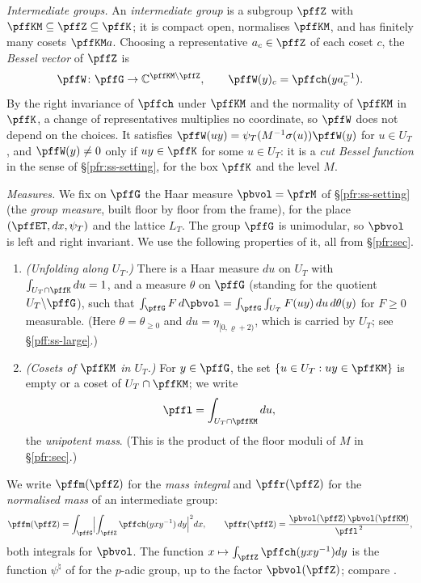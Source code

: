 \documentclass[10pt]{amsart}
\theoremstyle{definition}
\theoremstyle{remark}
\newcommand{\C}{\mathbb C}
\begin{document}
\emph{Intermediate groups.} An \emph{intermediate group} is a subgroup $\pffZ$ with $\pffKM\subseteq
\pffZ\subseteq\pffK$; it is compact open, normalises $\pffKM$, and has finitely many cosets
$\pffKM a$. Choosing a representative $a_c\in\pffZ$ of each coset $c$, the \emph{Bessel vector} of
$\pffZ$ is
\[
\pffW\colon\pffG\to\C^{\pffKM\backslash\pffZ},\qquad\pffW(y)_c=\pffch(ya_c^{-1}).
\]
By the right invariance of $\pffch$ under $\pffKM$ and the normality of $\pffKM$ in $\pffK$, a
change of representatives multiplies no coordinate, so $\pffW$ does not depend on the choices. It
satisfies $\pffW(uy)=\psi_T(M^{-1}\sigma(u))\pffW(y)$ for $u\in U_T$, and $\pffW(y)\ne0$ only if
$uy\in\pffK$ for some $u\in U_T$: it is a \emph{cut Bessel function} in the sense of
\S\ref{pfr:ss-setting}, for the box $\pffK$ and the level $M$.

\emph{Measures.} We fix on $\pffG$ the Haar measure $\pbvol=\pfrM$ of \S\ref{pfr:ss-setting}
(the \emph{group measure}, built floor by floor from the frame), for the place $(\pffET,dx,\psi_T)$
and the lattice $L_T$. The group $\pffG$ is unimodular, so $\pbvol$ is left and right invariant.
We use the following properties of it, all from \S\ref{pfr:sec}.
\begin{enumerate}
\item[(M1)] \emph{(Unfolding along $U_T$.)} There is a Haar measure $du$ on $U_T$ with
$\int_{U_T\cap\pffK}du=1$, and a measure $\theta$ on $\pffG$ (standing for the quotient
$U_T\backslash\pffG$), such that $\int_{\pffG}F\,d\pbvol=\int_{\pffG}\int_{U_T}F(uy)\,du\,
d\theta(y)$ for $F\ge0$ measurable. (Here $\theta=\theta_{\ge0}$ and $du=\eta_{[0,\varrho+2)}$, which is
carried by $U_T$; see \S\ref{pff:ss-large}.)
\item[(M2)] \emph{(Cosets of $\pffKM$ in $U_T$.)} For $y\in\pffG$, the set $\{u\in U_T:uy\in
\pffKM\}$ is empty or a coset of $U_T\cap\pffKM$; we write
\[
\pffl=\int_{U_T\cap\pffKM}du ,
\]
the \emph{unipotent mass}. (This is the product of the floor moduli of $M$ in
\S\ref{pfr:sec}.)
\end{enumerate}
We write $\pffm(\pffZ)$ for the \emph{mass integral} and $\pffr(\pffZ)$ for the
\emph{normalised mass} of an intermediate group:
\begin{equation}\label{pff:eq-mass}
\pffm(\pffZ)=\int_{\pffG}\Bigl|\int_{\pffZ}\pffch(yxy^{-1})\,dy\Bigr|^2dx,\qquad
\pffr(\pffZ)=\frac{\pbvol(\pffZ)\,\pbvol(\pffKM)}{\pffl^{\,2}},
\end{equation}
both integrals for $\pbvol$. The function $x\mapsto\int_{\pffZ}\pffch(yxy^{-1})dy$ is the
function $\psi^{\natural}$ of {\cite[Lemma~3.33(c)]{P51}} for the $p$-adic group, up to the factor
$\pbvol(\pffZ)$; compare {\cite[Remark~3.40(c)]{P51}}.
\end{document}
